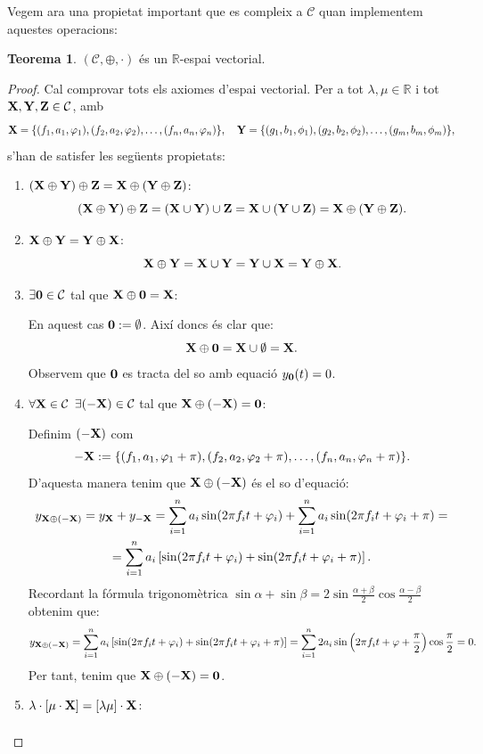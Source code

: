 \documentclass{article}
\theoremstyle{definition}
\newtheorem{theorem}[definition]{Teorema}
\newcommand{\0}{\ensuremath{\vb{0}}}
\newcommand{\X}{\ensuremath{\vb{X}}}
\newcommand{\Y}{\ensuremath{\vb{Y}}}
\newcommand{\Z}{\ensuremath{\vb{Z}}}
\newcommand{\RR}{\ensuremath{\mathbb{R}}} %
\begin{document}
Vegem ara una propietat important que es compleix a $\mathcal{C}$ quan implementem aquestes operacions:
\begin{theorem}
    $(\mathcal{C},\oplus,\cdot)$ és un $\RR$-espai vectorial.
\end{theorem}
\begin{proof}
    Cal comprovar tots els axiomes d'espai vectorial. Per a tot $\lambda,\mu\in\RR$ i tot $\X,\Y,\Z\in\mathcal{C}$, amb $$\X=\{(f_1,a_1,\varphi_1),(f_2,a_2,\varphi_2),\ldots,(f_n,a_n,\varphi_n)\},\quad\Y=\{(g_1,b_1,\phi_1),(g_2,b_2,\phi_2),\ldots,(g_m,b_m,\phi_m)\},$$  s'han de satisfer les següents propietats:
    \begin{enumerate}
        \item $(\X\oplus \Y)\oplus \Z=\X\oplus (\Y\oplus \Z)$:
        $$(\X\oplus \Y)\oplus \Z=(\X\cup \Y)\cup \Z=\X\cup(\Y\cup \Z)=\X\oplus (\Y\oplus \Z).$$
        \item $\X\oplus \Y=\Y\oplus \X$:
        $$\X\oplus \Y=\X\cup \Y=\Y\cup \X=\Y\oplus \X.$$
        \item $\exists \0\in\mathcal{C}$ tal que $\X\oplus\0=\X$:\par
        En aquest cas $\0:=\emptyset$. Així doncs és clar que: $$\X\oplus\0=\X\cup\emptyset=\X.$$ Observem que $\0$ es tracta del so amb equació $y_{\0}(t)=0$.
        \item $\forall \X\in\mathcal{C}$ $\exists (-\X)\in\mathcal{C}$ tal que $\X\oplus(-\X)=\0$:\par
        Definim $(-\X)$ com $$-\X:=\{(f_1,a_1,\varphi_1+\pi),(f_2,a_2,\varphi_2+\pi),\ldots,(f_n,a_n,\varphi_n+\pi)\}.$$ D'aquesta manera tenim que $\X\oplus(-\X)$ és el so d'equació:
        \begin{multline*}
            y_{\X\oplus(-\X)}=y_{\X}+y_{-\X}=\sum_{i=1}^na_i\sin(2\pi f_it+\varphi_i)+\sum_{i=1}^na_i\sin(2\pi f_it+\varphi_i+\pi)=\\=\sum_{i=1}^na_i\left[\sin(2\pi f_it+\varphi_i)+\sin(2\pi f_it+\varphi_i+\pi)\right].
        \end{multline*}
        Recordant la fórmula trigonomètrica $\sin\alpha+\sin\beta=2\sin\frac{\alpha+\beta}{2}\cos\frac{\alpha-\beta}{2}$ obtenim que: $$y_{\X\oplus(-\X)}=\sum_{i=1}^na_i\left[\sin(2\pi f_it+\varphi_i)+\sin(2\pi f_it+\varphi_i+\pi)\right]=\sum_{i=1}^n2a_i\sin\left(2\pi f_it+\varphi +\frac{\pi}{2}\right)\cos\frac{\pi}{2}=0.$$ Per tant, tenim que $\X\oplus(-\X)=\0$.
        \item $\lambda\cdot[\mu\cdot \X]=[\lambda\mu]\cdot \X$:
        \begin{multline*}

\end{multline*}
\end{enumerate}
\end{proof}
\end{document}
